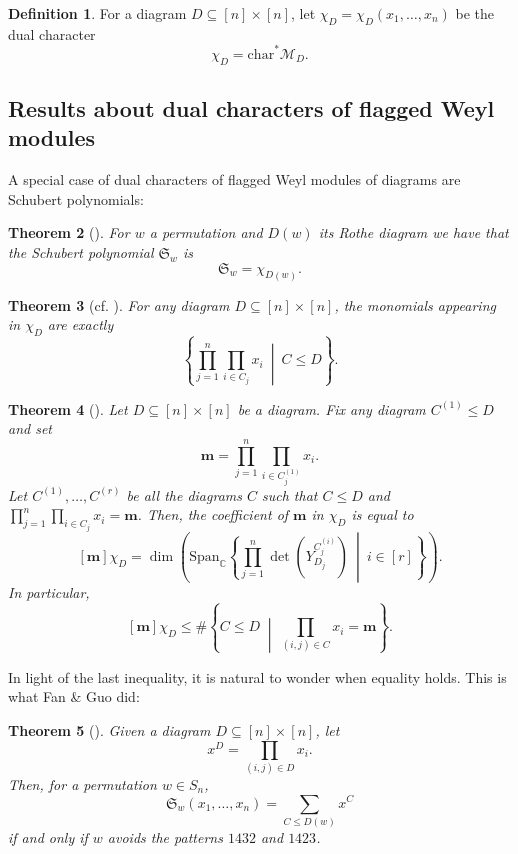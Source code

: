 \documentclass{amsart}
\newtheorem{theorem}{Theorem}[section]
\theoremstyle{definition}
\newtheorem{definition}[theorem]{Definition}
\theoremstyle{named}
\def\S{\mathfrak{S}}
\newcommand*{\Schub}{\mathfrak{S}}
\begin{document}
	\begin{definition}
		For a diagram $D\subseteq [n]\times [n]$, let $\chi_D=\chi_D(x_1,\ldots,x_n)$ be the dual character 
		\[\chi_D=\mathrm{char}^*\mathcal{M}_D. \] 
	\end{definition}
	\subsection{Results about dual characters of flagged Weyl modules}

	A special case of dual characters of flagged Weyl modules of diagrams are Schubert polynomials:

	\begin{theorem}[\cite{KP}]
		\label{thm:kp}
		For  $w$  a permutation and  $D(w)$ its Rothe diagram we have that the Schubert polynomial $\S_w$ is 
				\[\mathfrak{S}_w = \chi_{D(w)}. \]
	\end{theorem}
 
	\begin{theorem}[cf. {\cite[Theorem 7]{FMS}}]
		For any diagram $D\subseteq [n]\times [n]$, the monomials appearing in $\chi_D$ are exactly 
		\[\left\{\prod_{j=1}^{n}\prod_{i\in C_j}x_i\ \middle|\   C\leq D \right\}.\]
	\end{theorem}

	\begin{theorem}[\cite{zeroone}]
		\label{cor:fms}
		Let $D\subseteq [n]\times [n]$ be a diagram. Fix any diagram $C^{(1)}\leq D$ and set \[\bm{m}=\prod_{j=1}^{n}\prod_{i\in C^{(1)}_j}x_i.\] 
		Let $C^{(1)}, \ldots, C^{(r)}$ be all the diagrams $C$ such that $C\leq D$ and $\prod_{j=1}^{n}\prod_{i\in C_j}x_i=\bm{m}$. Then, the coefficient of $\bm{m}$ in $\chi_D$ is equal to 
		\[[\bm{m}]\chi_D =\dim \left(\mathrm{Span}_\mathbb{C}\left\{\prod_{j=1}^{n}\det\left(Y_{D_j}^{C^{(i)}_j}\right) \ \middle|\  i\in [r] \right\}\right).\] 
		In particular, 
		$$[\bm{m}]\chi_D \leq \#\left\{ C \le D \;\middle|\; \prod_{(i, j) \in C} x_i = \mathbf{m} \right\}.$$ 
	\end{theorem}

	In light of the last inequality,  it is  natural to wonder when equality holds.  This is what Fan \& Guo \cite{FG} did: 


\begin{theorem}[\cite{FG}]
\label{thm:fg}
Given a diagram $D \subseteq [n] \times [n]$, let
\[
x^D = \prod_{(i, j) \in D} x_i.
\]
Then, for a permutation $w \in S_n$,
\[
\Schub_w(x_1, \dots, x_n) = \sum_{C \le D(w)} x^C
\]
if and only if $w$ avoids the patterns $1432$ and $1423$.
\end{theorem}
\end{document}
